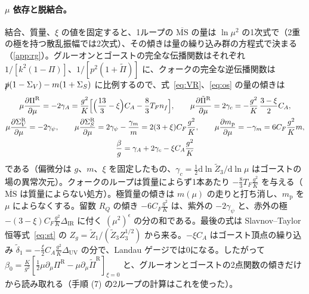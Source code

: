 \documentclass[a4paper,10pt]{ltjsarticle}
\newcommand{\dd}{\mathrm{d}}
\newcommand{\MSbar}{\overline{\mathrm{MS}}}
\newcommand{\DUV}{\Delta_{\mathrm{UV}}}
\newcommand{\DIR}{\Delta_{\mathrm{IR}}}
\begin{document}
\paragraph{$\mu$ 依存と脱結合。}結合、質量、$\xi$ の値を固定すると、1ループの $\MSbar$ の量は $\ln\mu^2$ の1次式で（2重の極を持つ散乱振幅では2次式）、その傾きは量の繰り込み群の方程式で決まる（\ref{app:rg}）。グルーオンとゴーストの完全な伝播関数はそれぞれ $1/[k^2(1-\Pi)]$、$1/[p^2(1+\tilde\Pi)]$ に、クォークの完全な逆伝播関数は $\slashed p(1-\Sigma_V)-m(1+\Sigma_S)$ に比例するので、式~\eqref{eq:VR}、\eqref{eq:os} の量の傾きは
\begin{equation}
\begin{gathered}
\mu\frac{\partial\Pi^{\mathrm R}}{\partial\mu}=-2\gamma_A=\frac{g^2}{K}\Bigl[\Bigl(\frac{13}3-\xi\Bigr)C_A-\frac83T_Fn_f\Bigr],\qquad
\mu\frac{\partial\tilde\Pi^{\mathrm R}}{\partial\mu}=2\gamma_c=-\frac{g^2}{K}\,\frac{3-\xi}{2}C_A,\\
\mu\frac{\partial\Sigma_V^{\mathrm R}}{\partial\mu}=-2\gamma_\psi,\qquad
\mu\frac{\partial\Sigma_S^{\mathrm R}}{\partial\mu}=2\gamma_\psi-\frac{\gamma_m}{m}=2(3+\xi)C_F\frac{g^2}{K},\qquad
\mu\frac{\partial m_{\mathrm p}}{\partial\mu}=-\gamma_m=6C_F\frac{g^2}{K}m,\\
\frac{\beta}{g}=\gamma_A+2\gamma_c-\xi C_A\frac{g^2}{K}
\end{gathered}
\label{eq:rgslope}
\end{equation}
である（偏微分は $g$、$m$、$\xi$ を固定したもの、$\gamma_c=\frac12\dd\ln\tilde Z_3/\dd\ln\mu$ はゴーストの場の異常次元）。クォークのループは質量によらず1本あたり $-\frac83T_F\frac{g^2}K$ を与える（$\MSbar$ は質量によらない処方）。極質量の傾きは $m(\mu)$ の走りと打ち消し、$m_{\mathrm p}$ を $\mu$ によらなくする。留数 $R_Q$ の傾き $-6C_F\frac{g^2}K$ は、紫外の $-2\gamma_\psi$ と、赤外の極 $-(3-\xi)C_F\frac{g^2}{K}\DIR$ に付く $(\mu^2)^\epsilon$ の分の和である。最後の式は Slavnov--Taylor 恒等式~\eqref{eq:st} の $Z_g=\tilde Z_1/(\tilde Z_3Z_3^{1/2})$ から来る。$-\xi C_A$ はゴースト頂点の繰り込み $\tilde\delta_1=-\frac\xi2C_A\frac{g^2}K\DUV$ の分で、Landau ゲージでは0になる。したがって $\beta_0=\frac K{g^2}[\frac12\mu\partial_\mu\Pi^{\mathrm R}-\mu\partial_\mu\tilde\Pi^{\mathrm R}]_{\xi=0}$ と、グルーオンとゴーストの2点関数の傾きだけから読み取れる（手順 (7) の2ループの計算はこれを使った）。
\end{document}
